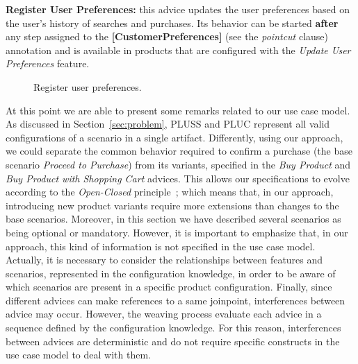 \documentclass{acm_proc_article-sp}
\begin{document}
{\bf Register User Preferences:} this advice updates the user preferences based
on the user's history of searches and purchases. Its behavior can be started {\bf
after} any step assigned to the {\bf [CustomerPreferences]} (see the
\emph{pointcut} clause) annotation and is available in products that are
configured with the \emph{Update User Preferences} feature.

\begin{figure}[h]
\caption{Register user preferences.}
\label{fig:register-preferences-flow}
\end{figure}

{\color{red} At this point we are able to present some remarks related to our use
case model. As discussed in Section~\ref{sec:problem}, PLUSS and PLUC represent
all valid configurations of a scenario in a single artifact. Differently, using
our approach, we could separate the common behavior required to confirm a
purchase (the base scenario \emph{Proceed to Purchase}) from its variants,
specified in the \emph{Buy Product} and \emph{Buy Product with Shopping Cart}
advices. This allows our specifications to evolve according to the
\emph{Open-Closed} principle~\cite{Meyer:2000aa}; which means that, in our
approach, introducing new product variants require more extensions than changes
to the base scenarios. Moreover, in this section we have described several
scenarios as being optional or mandatory. However, it is important to emphasize
that, in our approach, this kind of information is not specified in the use case
model. Actually, it is necessary to consider the relationships between features
and scenarios, represented in the configuration knowledge, in order to be aware
of which scenarios are present in a specific product configuration. Finally,
since different advices can make references to a same joinpoint,  interferences
between advice may occur. However, the weaving process evaluate each advice in a
sequence defined by the configuration knowledge. For this reason, interferences
between advices are deterministic and do not require specific constructs in the
use case model to deal with them.}
\end{document}

